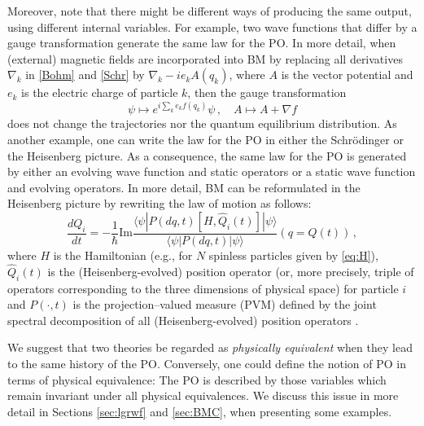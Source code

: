 \documentclass[12pt]{article}
\renewcommand{\Im}{\mathrm{Im}}
\renewcommand{\sp}[2]{\langle #1|#2 \rangle}
\begin{document}
Moreover, note that there might be different ways of producing the same output, using different internal variables.
For example, two wave functions that differ by a gauge transformation generate the same law for the PO. 
In more detail, when (external) magnetic fields are incorporated into {\sf BM} by replacing all derivatives $\nabla_k$ in \eqref{Bohm} and \eqref{Schr} by $\nabla_k - i e_kA(q_k)$, where $A$ is the vector potential and $e_k$ is the electric charge of particle $k$, then the gauge transformation
\begin{equation}
  \psi \mapsto e^{i\sum_k e_kf(q_k)} \psi\,, \quad A \mapsto A +\nabla f
\end{equation}
does not change the trajectories nor the quantum equilibrium
distribution.
As another example, one can write the law for the PO in either the Schr\"odinger or the Heisenberg picture. As a consequence, the same law for the PO is generated by either an evolving wave function and static operators or a static wave function and evolving operators.
In more detail, {\sf BM} can be reformulated in the Heisenberg
picture by rewriting the law of motion as follows:
\begin{equation} 
  \frac{dQ_i}{dt} = - \frac{1}{\hbar} \Im \frac{\sp{\psi}{P(dq,t)
  [H,\widehat{Q}_i(t)]|\psi}}{\sp{\psi}{P(dq,t)|\psi}} (q=Q(t))\,,
\end{equation}
where $H$ is the Hamiltonian (e.g., for $N$ spinless particles given by \eqref{eq:H}), $\widehat{Q}_i(t)$ is the (Heisenberg-evolved) position operator (or, more precisely, triple of operators corresponding to the three dimensions of physical space) for particle $i$ and $P(\cdot,t)$ is the projection--valued measure (PVM) defined by the joint spectral decomposition of all (Heisenberg-evolved) position operators \citep{crea2B}.

We suggest that two theories be regarded as \emph{physically equivalent} when they lead to the same history of the PO. Conversely,
one could define the notion of PO in terms of physical equivalence: The PO is described by those variables which remain invariant under all physical equivalences.
We discuss this issue in more detail in Sections \ref{sec:lgrwf} and \ref{sec:BMC}, when presenting some examples.
\end{document}
